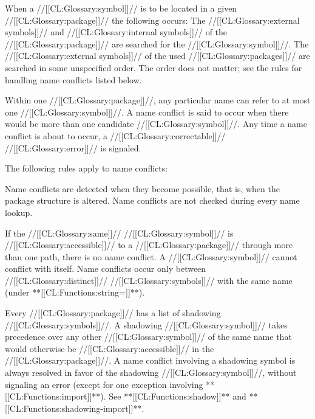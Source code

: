 \endsubsubsubsection%



When a //[[CL:Glossary:symbol]]// is to be located in a given //[[CL:Glossary:package]]// 
the following occurs:
\beginlist 
\itemitem{--} The //[[CL:Glossary:external symbols]]// and //[[CL:Glossary:internal symbols]]// of the 
//[[CL:Glossary:package]]// are searched for the //[[CL:Glossary:symbol]]//.
\itemitem{--} The //[[CL:Glossary:external symbols]]// of the used //[[CL:Glossary:packages]]// are 
searched
in some unspecified order.  The
order does not matter; see the rules for handling name
conflicts listed below. 
\endlist

\endsubsubsubsection%



Within one //[[CL:Glossary:package]]//, any particular name can refer to at most one
//[[CL:Glossary:symbol]]//.  A name conflict is said to occur when there would be more than
one candidate //[[CL:Glossary:symbol]]//.  Any time a name conflict is about to occur,
a //[[CL:Glossary:correctable]]// //[[CL:Glossary:error]]// is signaled.  

The following rules apply to name conflicts:

\beginlist

\itemitem{--}
Name conflicts are detected when they become possible, that is, when the
package structure is altered.  Name
conflicts are not checked during every name lookup.

\itemitem{--}
If the //[[CL:Glossary:same]]// //[[CL:Glossary:symbol]]// is //[[CL:Glossary:accessible]]// to a //[[CL:Glossary:package]]// 
through more than one path, there is no name conflict.
A //[[CL:Glossary:symbol]]// cannot conflict with itself. 
Name conflicts occur only between //[[CL:Glossary:distinct]]// //[[CL:Glossary:symbols]]// with
the same name (under **[[CL:Functions:string=]]**).


\itemitem{--} Every //[[CL:Glossary:package]]// has a list of shadowing //[[CL:Glossary:symbols]]//.  
A shadowing //[[CL:Glossary:symbol]]// takes precedence over any other //[[CL:Glossary:symbol]]// of
the same name that would otherwise be //[[CL:Glossary:accessible]]// in the //[[CL:Glossary:package]]//.  
A name conflict involving a shadowing symbol is always resolved in favor of
the shadowing //[[CL:Glossary:symbol]]//, without signaling an error (except for one
exception involving **[[CL:Functions:import]]**).
See **[[CL:Functions:shadow]]** and **[[CL:Functions:shadowing-import]]**.


